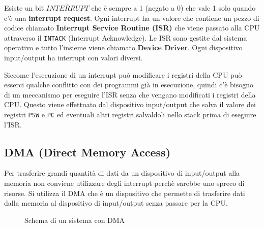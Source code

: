 \documentclass[a4paper]{article}
\theoremstyle{break}
\theoremstyle{break}
\theoremstyle{break}
\theoremstyle{break}
\begin{document}
\noindent Esiste un bit \( \overline{INTERRUPT} \) che è sempre a 1 (negato a 0) che
vale 1 solo quando c'è una \textbf{interrupt request}. Ogni interrupt ha un valore
che contiene un pezzo di codice chiamato \textbf{Interrupt Service Routine (ISR)}
che viene passato alla CPU attraverso il \texttt{INTACK} (Interrupt Acknowledge).
Le ISR sono gestite dal sistema operativo e tutto l'insieme viene chiamato \textbf{Device Driver}.
Ogni dispositivo input/output ha interrupt con valori diversi.

\vspace{1em}
\noindent Siccome l'esecuzione di un interrupt può modificare i registri della CPU può esserci
qualche conflitto con dei programmi già in esecuzione, quindi c'è bisogno di un meccanismo
per eseguire l'ISR senza che vengano modificati i registri della CPU. Questo viene
effettuato dal dispositivo input/output che salva il valore dei registri \texttt{PSW} e
\texttt{PC} ed eventuali altri registri salvaldoli nello stack prima di eseguire l'ISR.

\subsection{DMA (Direct Memory Access)}
Per trasferire grandi quantità di dati da un dispositivo di input/output alla memoria
non conviene utilizzare degli interrupt perchè sarebbe uno spreco di risorse. Si utilizza
il DMA che è un dispositivo che permette di trasferire dati dalla memoria al dispositivo
di input/output senza passare per la CPU.

\begin{figure}[H]
	\centering
	\caption{Schema di un sistema con DMA}
\end{figure}
\end{document}
